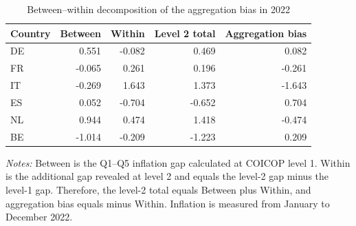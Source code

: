 \begin{table}

\caption{\label{tab:aggregation-bias-between-within-2022}Between--within decomposition of the aggregation bias in 2022}
\centering
\begin{tabular}[t]{lrrrr}
\toprule
Country & Between & Within & Level 2 total & Aggregation bias\\
\midrule
DE & 0.551 & -0.082 & 0.469 & 0.082\\
FR & -0.065 & 0.261 & 0.196 & -0.261\\
IT & -0.269 & 1.643 & 1.373 & -1.643\\
ES & 0.052 & -0.704 & -0.652 & 0.704\\
NL & 0.944 & 0.474 & 1.418 & -0.474\\
\addlinespace
BE & -1.014 & -0.209 & -1.223 & 0.209\\
\bottomrule
\end{tabular}
\end{table}
\begin{flushleft}
\footnotesize{\emph{Notes:} Between is the Q1--Q5 inflation gap calculated at COICOP level 1. Within is the additional gap revealed at level 2 and equals the level-2 gap minus the level-1 gap. Therefore, the level-2 total equals Between plus Within, and aggregation bias equals minus Within. Inflation is measured from January to December 2022.}
\end{flushleft}
